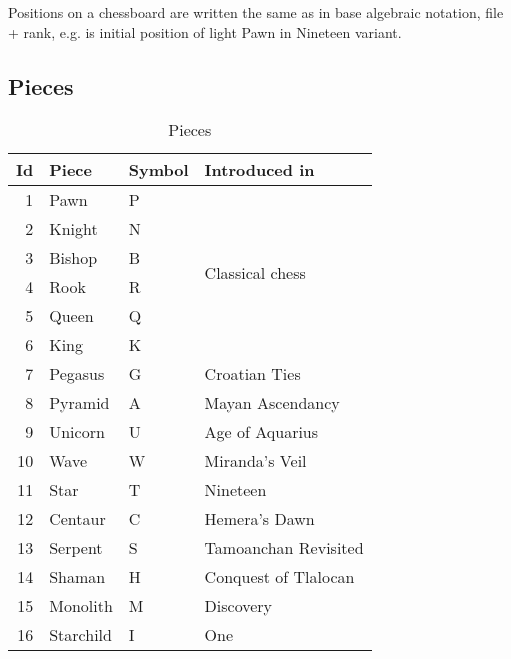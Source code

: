 Positions on a chessboard are written the same as in base algebraic notation, file + rank,
e.g.  is initial position of light Pawn in Nineteen variant.

\clearpage %

\subsection*{Pieces}
\label{sec:Appendix/Introduction/Pieces}

\begin{table}[!h]
\centering
\begin{tabular}{ rlll }
\toprule
\textbf{Id} & \textbf{Piece} & \textbf{Symbol} & \textbf{Introduced in}           \\
\midrule
1           & Pawn           & P               & \multirow{6}{*}{Classical chess} \\
2           & Knight         & N               &                                  \\
3           & Bishop         & B               &                                  \\
4           & Rook           & R               &                                  \\
5           & Queen          & Q               &                                  \\
6           & King           & K               &                                  \\ \cmidrule{1-4}
7           & Pegasus        & G               & Croatian Ties                    \\
8           & Pyramid        & A               & Mayan Ascendancy                 \\
9           & Unicorn        & U               & Age of Aquarius                  \\
10          & Wave           & W               & Miranda's Veil                   \\
11          & Star           & T               & Nineteen                         \\
12          & Centaur        & C               & Hemera's Dawn                    \\
13          & Serpent        & S               & Tamoanchan Revisited             \\
14          & Shaman         & H               & Conquest of Tlalocan             \\
15          & Monolith       & M               & Discovery                        \\
16          & Starchild      & I               & One                              \\
\bottomrule
\end{tabular}
\caption{Pieces}
\label{tbl:Appendix/Introduction/Pieces}
\end{table}

